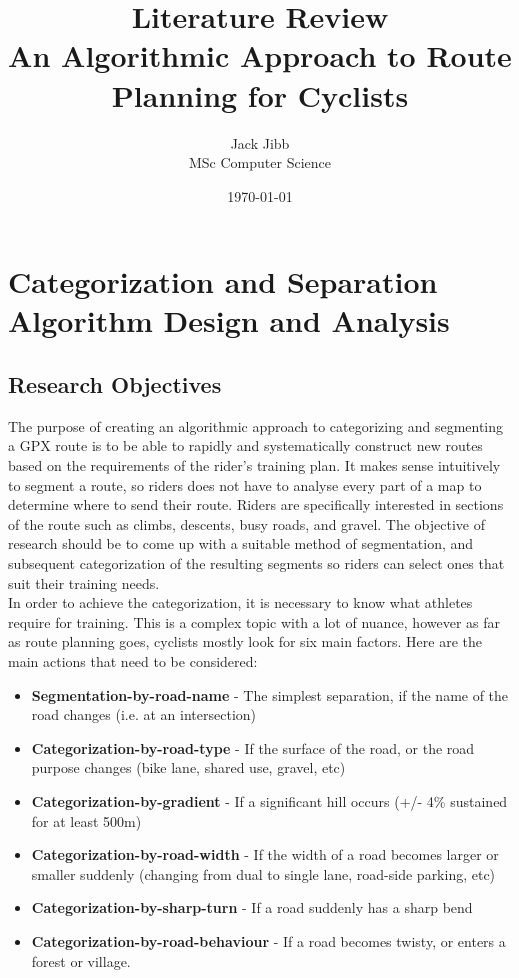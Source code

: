 \documentclass[12pt,a4paper]{article}
\title{Literature Review \\ \large An Algorithmic Approach to Route Planning for Cyclists}
\author{Jack Jibb \\ MSc Computer Science}
\date{\today}
\begin{document}
\maketitle

\tableofcontents
\newpage

\section{Categorization and Separation Algorithm Design and Analysis}

\subsection{Research Objectives}
The purpose of creating an algorithmic approach to categorizing and segmenting a GPX route is to be able to rapidly and systematically construct new routes based on the requirements of the rider's training plan.
It makes sense intuitively to segment a route, so riders does not have to analyse every part of a map to determine where to send their route. Riders are specifically interested in sections of the route such as climbs, descents, busy roads, and gravel.
The objective of research should be to come up with a suitable method of segmentation, and subsequent categorization of the resulting segments so riders can select ones that suit their training needs.
\\
In order to achieve the categorization, it is necessary to know what athletes require for training. This is a complex topic with a lot of nuance, however as far as route planning goes, cyclists mostly look for six main factors.
Here are the main actions that need to be considered:
\begin{itemize}
	\item \textbf{Segmentation-by-road-name} - The simplest separation, if the name of the road changes (i.e. at an intersection)
	\item \textbf{Categorization-by-road-type} - If the surface of the road, or the road purpose changes (bike lane, shared use, gravel, etc)
	\item \textbf{Categorization-by-gradient} - If a significant hill occurs (+/- 4\% sustained for at least 500m)
	\item \textbf{Categorization-by-road-width} - If the width of a road becomes larger or smaller suddenly (changing from dual to single lane, road-side parking, etc)
	\item \textbf{Categorization-by-sharp-turn} - If a road suddenly has a sharp bend
	\item \textbf{Categorization-by-road-behaviour} - If a road becomes twisty, or enters a forest or village.
\end{itemize}
\end{document}
